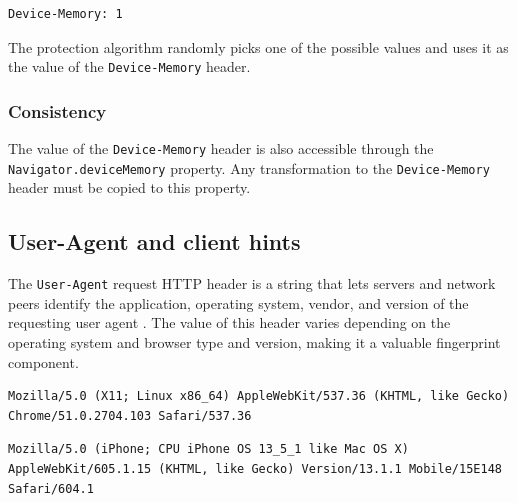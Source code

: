 \bigbreak

\begin{lstlisting}[caption={An example of Device-Memory header contents \cite{MDN}.}, label={Fig:DeviceMemoryExample}]
Device-Memory: 1
\end{lstlisting}

\medbreak


The protection algorithm randomly picks one of the possible values and uses it as the value of the \texttt{Device-Memory} header.

\subsubsection{Consistency}

The value of the \texttt{Device-Memory} header is also accessible through the \texttt{Navigator.deviceMemory} property. Any transformation to the \texttt{Device-Memory} header must be copied to this property.

\subsection{User-Agent and client hints}

The \texttt{User-Agent} request HTTP header is a string that lets servers and network peers identify the application, operating system, vendor, and version of the requesting user agent \cite{MDN}. The value of this header varies depending on the operating system and browser type and version, making it a valuable fingerprint component.

\bigbreak

\begin{lstlisting}[caption={An example of Chrome User-Agent string \cite{MDNHeaderUserAgent}.}, label={Listing:UserAgentChrome}]
Mozilla/5.0 (X11; Linux x86_64) AppleWebKit/537.36 (KHTML, like Gecko) Chrome/51.0.2704.103 Safari/537.36
\end{lstlisting}

\begin{lstlisting}[caption={An example of Safari User-Agent string (mobile version) \cite{MDNHeaderUserAgent}.}, label={Listing:UserAgentSafari}]
Mozilla/5.0 (iPhone; CPU iPhone OS 13_5_1 like Mac OS X) AppleWebKit/605.1.15 (KHTML, like Gecko) Version/13.1.1 Mobile/15E148 Safari/604.1
\end{lstlisting}

\medbreak

